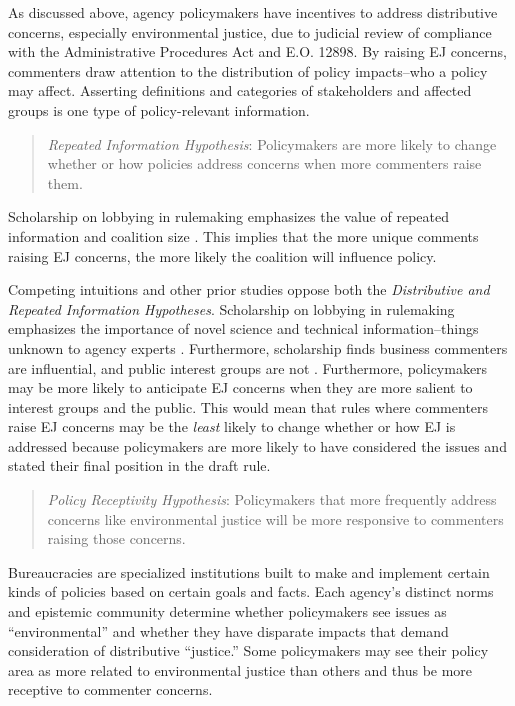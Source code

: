 \documentclass[
      12pt,
        ]{article}
\begin{document}
As discussed above, agency policymakers have incentives to address distributive concerns, especially environmental justice, due to judicial review of compliance with the Administrative Procedures Act and E.O. 12898. By raising EJ concerns, commenters draw attention to the distribution of policy impacts--who a policy may affect. Asserting definitions and categories of stakeholders and affected groups is one type of policy-relevant information.

\begin{quote}
\emph{Repeated Information Hypothesis}: Policymakers are more likely to change whether or how policies address concerns when more commenters raise them.
\end{quote}

Scholarship on lobbying in rulemaking emphasizes the value of repeated information and coalition size \citep{Nelson2012}. This implies that the more unique comments raising EJ concerns, the more likely the coalition will influence policy.

Competing intuitions and other prior studies oppose both the \emph{Distributive and Repeated Information Hypotheses}. Scholarship on lobbying in rulemaking emphasizes the importance of novel science and technical information--things unknown to agency experts \citep{Wagner2010}. Furthermore, scholarship finds business commenters are influential, and public interest groups are not \citep[\citet{Haeder2015}]{Yackee2006JOP}. Furthermore, policymakers may be more likely to anticipate EJ concerns when they are more salient to interest groups and the public. This would mean that rules where commenters raise EJ concerns may be the \emph{least} likely to change whether or how EJ is addressed because policymakers are more likely to have considered the issues and stated their final position in the draft rule.

\begin{quote}
\emph{Policy Receptivity Hypothesis}: Policymakers that more frequently address concerns like environmental justice will be more responsive to commenters raising those concerns.
\end{quote}

Bureaucracies are specialized institutions built to make and implement certain kinds of policies based on certain goals and facts. Each agency's distinct norms and epistemic community determine whether policymakers see issues as ``environmental'' and whether they have disparate impacts that demand consideration of distributive ``justice.'' Some policymakers may see their policy area as more related to environmental justice than others and thus be more receptive to commenter concerns.
\end{document}
